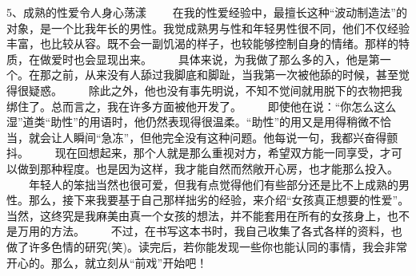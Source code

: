 \documentclass[12pt,UTF8]{ctexbook}
\begin{document}
5、成熟的性爱令人身心荡漾 　　在我的性爱经验中，最擅长这种“波动制造法”的对象，是一个比我年长的男性。我觉成熟男与性和年轻男性很不同，他们不仅经验丰富，也比较从容。既不会一副饥渴的样子，也较能够控制自身的情绪。那样的特质，在做爱时也会显现出来。 　　具体来说，为我做了那么多的入，他是第一个。在那之前，从来没有人舔过我脚底和脚趾，当我第一次被他舔的时候，甚至觉得很疑惑。 　　除此之外，他也没有事先明说，不知不觉间就用脱下的衣物把我绑住了。总而言之，我在许多方面被他开发了。 　　即使他在说：“你怎么这么湿”道类“助性”的用语时，他仍然表现得很温柔。“助性”的用又是用得稍微不恰当，就会让人瞬间“急冻”，但他完全没有这种问题。他每说一句，我都兴奋得颤抖。 　　现在回想起来，那个人就是那么重视对方，希望双方能一同享受，才可以做到那种程度。也是因为这样，我才能自然而然敞开心房，也才能那么投入。 　　年轻人的笨拙当然也很可爱，但我有点觉得他们有些部分还是比不上成熟的男性。那么，接下来我要基于自己那样拙劣的经验，来介绍“女孩真正想要的性爱”。当然，这终究是我麻美由真一个女孩的想法，并不能套用在所有的女孩身上，也不是万用的方法。 　　不过，在书写这本书时，我自己收集了各式各样的资料，也做了许多色情的研究(笑)。读完后，若你能发现一些你也能认同的事情，我会非常开心的。那么，就立刻从“前戏”开始吧！










\backmatter
\end{document}
